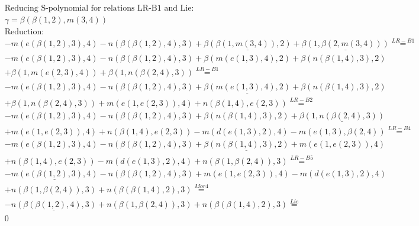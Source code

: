 \documentclass[11pt]{amsart}
\begin{document}
\begin{align*} 
& \text{Reducing S-polynomial for relations LR-B1 and Lie:} \\ 
& \gamma = \beta(\beta(1,2),m(3,4)) \\ 
& \text{Reduction}: \\& - m(e(\beta(1,2),3),4) - n(\beta(\beta(1,2),4),3) + \underline{\beta(\beta(1,m(3,4)),2)} + \underline{\beta(1,\beta(2,m(3,4)))} \stackrel{ LR-B1 }{=}  \\ 
& - m(e(\beta(1,2),3),4) - n(\beta(\beta(1,2),4),3) + \beta(m(e(1,3),4),2) + \beta(n(\beta(1,4),3),2)\\ 
 &  + \underline{\beta(1,m(e(2,3),4))} + \beta(1,n(\beta(2,4),3)) \stackrel{ LR-B1 }{=}  \\ 
& - m(e(\beta(1,2),3),4) - n(\beta(\beta(1,2),4),3) + \underline{\beta(m(e(1,3),4),2)} + \beta(n(\beta(1,4),3),2)\\ 
 &  + \beta(1,n(\beta(2,4),3)) + m(e(1,e(2,3)),4) + n(\beta(1,4),e(2,3)) \stackrel{ LR-B2 }{=}  \\ 
& - m(e(\beta(1,2),3),4) - n(\beta(\beta(1,2),4),3) + \beta(n(\beta(1,4),3),2) + \underline{\beta(1,n(\beta(2,4),3))}\\ 
 &  + m(e(1,e(2,3)),4) + n(\beta(1,4),e(2,3)) - m(d(e(1,3),2),4) - m(e(1,3),\beta(2,4)) \stackrel{ LR-B4 }{=}  \\ 
& - m(e(\beta(1,2),3),4) - n(\beta(\beta(1,2),4),3) + \underline{\beta(n(\beta(1,4),3),2)} + m(e(1,e(2,3)),4)\\ 
 &  + n(\beta(1,4),e(2,3)) - m(d(e(1,3),2),4) + n(\beta(1,\beta(2,4)),3) \stackrel{ LR-B5 }{=}  \\ 
& - \underline{m(e(\beta(1,2),3),4)} - n(\beta(\beta(1,2),4),3) + m(e(1,e(2,3)),4) - m(d(e(1,3),2),4)\\ 
 &  + n(\beta(1,\beta(2,4)),3) + n(\beta(\beta(1,4),2),3) \stackrel{ Mor4 }{=}  \\ 
& - \underline{n(\beta(\beta(1,2),4),3)} + n(\beta(1,\beta(2,4)),3) + n(\beta(\beta(1,4),2),3) \stackrel{ Lie }{=}  \\ 
&0\\ 
\end{align*} 
 
\end{document}
